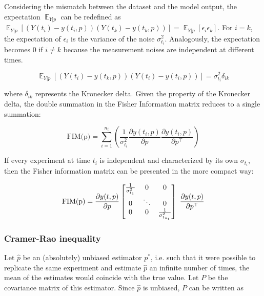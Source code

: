 \documentclass[../Article_Design_of_Experiment.tex]{subfiles}
\begin{document}
	Considering the mismatch between the dataset and the model output, the expectation $\mathop{\mathbb{E}}_{Y|p}$ can be redefined as $\mathop{\mathbb{E}}_{Y|p} \left[ \left( Y(t_i) - y(t_i, p) \right) \left( Y(t_k) - y(t_k, p) \right) \right] = \mathop{\mathbb{E}}_{Y|p} \left[ \epsilon_i \epsilon_k \right]$. For $i=k$, the expectation of $\epsilon_i$ is the variance of the noise $\sigma_{t_i}^2$. Analogously, the expectation becomes 0 if $i \neq k$ because the measurement noises are independent at different times.
	
	{\footnotesize
	\begin{equation}
		\mathop{\mathbb{E}}_{Y|p} \left[ \left( Y(t_i) - y(t_k, p) \right) \left( Y(t_i) - y(t_i, p) \right) \right] = \sigma_{t_i}^2 \delta_{ik}
	\end{equation} }
	
	where $\delta_{ik}$ represents the Kronecker delta. Given the property of the Kronecker delta, the double summation in the Fisher Information matrix reduces to a single summation:
	
	{\footnotesize
	\begin{equation}
		\text{FIM(p)} = \sum_{i=1}^{n_t} \left( \frac{1}{\sigma_{t_i}^2} \frac{\partial y(t_i, p)}{\partial p} \frac{\partial y(t_i, p)}{\partial p^\top} \right)
	\end{equation} }
	
	If every experiment at time $t_i$ is independent and characterized by its own $\sigma_{t_i}$, then the Fisher information matrix can be presented in the more compact way:
	
	{\footnotesize
	\begin{equation}
		\text{\text{FIM(p)}} = \frac{\partial y(t, p)}{\partial p} \begin{bmatrix}
			\frac{1}{\sigma_{t_1}^2} & 0 & 0\\
			0 & \ddots & 0 \\
			0 & 0 & \frac{1}{\sigma_{t_{n_t}}^2} 
		\end{bmatrix}\ \frac{\partial y(t, p)}{\partial p^\top} 
	\end{equation} }
	
	\subsubsection{Cramer-Rao inequality}
	
	Let $\hat{p}$ be an (absolutely) unbiased estimator $p^*$, i.e. such that it were possible to replicate the same experiment and estimate $\hat{p}$ an infinite number of times, the mean of the estimates would coincide with the true value. Let $P$ be the covariance matrix of this estimator. Since $\hat{p}$ is unbiased, $P$ can be written as
	
\end{document}
